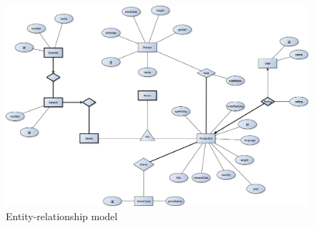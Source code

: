 \documentclass[12pt,table,xcdraw]{article}
\begin{document}
	
	
	\begin{figure}
		\centering
		\centerline{\includegraphics[scale=0.35]{figures/ERD.pdf}}
		\caption{Entity-relationship model}
	\end{figure}
	
	
	
	
\end{document}
